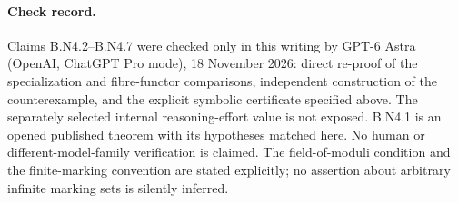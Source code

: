 \paragraph{Check record.}
Claims B.N4.2--B.N4.7 were checked only in this writing by GPT-6 Astra
(OpenAI, ChatGPT Pro mode), 18 November 2026: direct re-proof of the
specialization and fibre-functor comparisons, independent construction
of the counterexample, and the explicit symbolic certificate specified
above.  The separately selected internal reasoning-effort value is not
exposed.  B.N4.1 is an opened published theorem with its hypotheses
matched here.  No human or different-model-family verification is
claimed.  The field-of-moduli condition and the finite-marking
convention are stated explicitly; no assertion about arbitrary infinite
marking sets is silently inferred.
